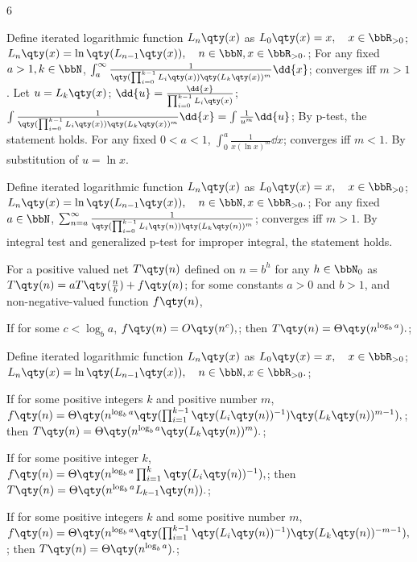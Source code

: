 \documentclass[a4paper,10pt]{extarticle}
\begin{document}
\begin{multicols}{6}

Define iterated logarithmic function $L_n\qty(x)$ as
\(L_{0}\qty(x)=x,\quad x\in\bbR_{>0}\); 
\(L_{n}\qty(x)=\ln\qty(L_{n-1}\qty(x)),\quad n\in\bbN,x\in\bbR_{>0}.\); 
For any fixed $a>1,k\in\bbN$,
\(\int_a^{\infty}\frac{1}{\qty(\prod_{i=0}^{k-1}L_{i}\qty(x))\qty(L_{k}\qty(x))^m}\dd{x}\); 
converges iff $m>1$.
\bpr
Let
\(u=L_k\qty(x)\); 
\(\dd{u}=\frac{\dd{x}}{\prod_{i=0}^{k-1}L_{i}\qty(x)}\); 
\(\int\frac{1}{\qty(\prod_{i=0}^{k-1}L_{i}\qty(x))\qty(L_{k}\qty(x))^m}\dd{x}=\int\frac{1}{u^m}\dd{u}\); 
By p-test, the statement holds.
\epr
For any fixed $0<a<1$,
\(\int_0^a\frac{1}{x(\ln x)^m}\dd{x}\); 
converges iff $m<1$.
\bpr
By substitution of $u=\ln x$.
\epr


Define iterated logarithmic function $L_n\qty(x)$ as
\(L_{0}\qty(x)=x,\quad x\in\bbR_{>0}\); 
\(L_{n}\qty(x)=\ln\qty(L_{n-1}\qty(x)),\quad n\in\bbN,x\in\bbR_{>0}.\); 
For any fixed $a\in\bbN$,
\(\sum_{n=a}^{\infty}\frac{1}{\qty(\prod_{i=0}^{k-1}L_{i}\qty(n))\qty(L_{k}\qty(n))^m}\); 
converges iff $m>1$.
\bpr
By integral test and generalized p-test for improper integral, the statement holds.
\epr


For a positive valued net $T\qty(n)$ defined on $n=b^h$ for any $h\in\bbN_0$ as
\(T\qty(n)=aT\qty(\frac{n}{b})+f\qty(n)\); 
for some constants $a>0$ and $b>1$, and non-negative-valued function $f\qty(n)$,

If for some $c<\log_ba$,
\(f\qty(n)=O\qty(n^c),\); 
then
\(T\qty(n)=\Theta\qty(n^{\log_ba}).\); 

Define iterated logarithmic function $L_n\qty(x)$ as
\(L_{0}\qty(x)=x,\quad x\in\bbR_{>0}\); 
\(L_{n}\qty(x)=\ln\qty(L_{n-1}\qty(x)),\quad n\in\bbN,x\in\bbR_{>0}.\); 

If for some positive integers $k$ and positive number $m$, 
\(f\qty(n)=\Theta\qty(n^{\log_ba}\qty(\prod_{i=1}^{k-1}\qty(L_{i}\qty(n))^{-1})\qty(L_{k}\qty(n))^{m-1}),\); 
then
\(T\qty(n)=\Theta\qty(n^{\log_ba}\qty(L_{k}\qty(n))^m).\); 

If for some positive integer $k$, 
\(f\qty(n)=\Theta\qty(n^{\log_ba}\prod_{i=1}^k\qty(L_{i}\qty(n))^{-1}),\); 
then
\(T\qty(n)=\Theta\qty(n^{\log_ba}L_{k-1}\qty(n)).\); 

If for some positive integers $k$ and some positive number $m$,
\(f\qty(n)=\Theta\qty(n^{\log_ba}\qty(\prod_{i=1}^{k-1}\qty(L_{i}\qty(n))^{-1})\qty(L_{k}\qty(n))^{-m-1}),\); 
then
\(T\qty(n)=\Theta\qty(n^{\log_ba}).\); 


\end{multicols}
\end{document}
